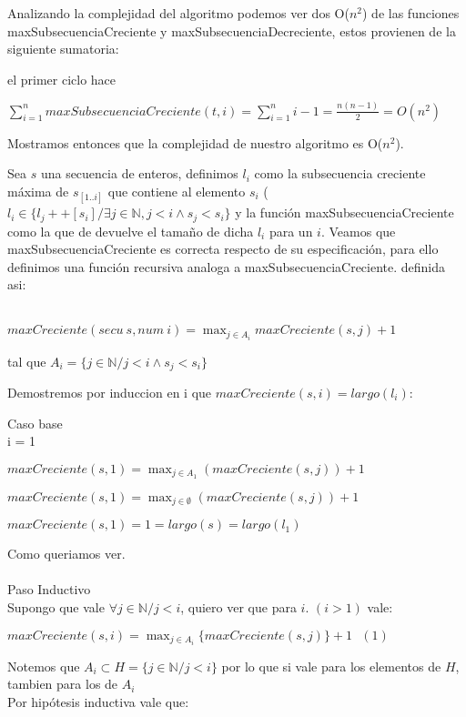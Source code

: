 Analizando la complejidad del algoritmo podemos ver dos O($n^{2}$) de las funciones maxSubsecuenciaCreciente y maxSubsecuenciaDecreciente, estos provienen de la siguiente sumatoria:

el primer ciclo hace

$\displaystyle\sum_{i=1}^n maxSubsecuenciaCreciente(t, i) = \sum_{i=1}^{n} i-1  = \frac{n(n-1)}{2} = O(n^{2})$

                       
Mostramos entonces que la complejidad de nuestro algoritmo es O($n^{2}$).




Sea $s$ una secuencia de enteros, definimos $l_i$ como la subsecuencia creciente máxima de $s_[1..i]$ que contiene al elemento $s_i$ ($l_i \in
  \{l_j ++ [s_i] / \exists j \in \mathbb{N}, j < i \land s_j < s_i\}$ y la función maxSubsecuenciaCreciente como la que de devuelve el tamaño de dicha $l_i$ para un $i$. Veamos que maxSubsecuenciaCreciente es correcta respecto de su especificación, para ello definimos una función recursiva analoga a maxSubsecuenciaCreciente. definida asi:\\
\\
    \centerline{$ \displaystyle maxCreciente(secu\ s, num\ i) = \max_{j \in A_i} maxCreciente(s, j) + 1$} 
    \centerline{tal que $A_i = \{ j \in \mathbb{N} / j < i \land s_j < s_i \}$}

Demostremos por induccion en i que $maxCreciente(s,i) = largo(l_i)$:

Caso base\\
i = 1 \\
\centerline{$\displaystyle maxCreciente(s, 1) = \max_{j \in A_1} (maxCreciente(s,j)) + 1$}
\centerline{$\displaystyle maxCreciente(s, 1) = \max_{j \in \emptyset} (maxCreciente(s,j)) + 1$}
\centerline{$\displaystyle maxCreciente(s, 1) = 1 = largo(s) = largo(l_1)$} 
Como queriamos ver.\\
\\
Paso Inductivo\\
Supongo que vale $\forall j \in \mathbb{N} / j < i$, quiero ver que para $i$. $(i > 1)$ vale:\\
\centerline{$\displaystyle maxCreciente(s, i) = \max_{j \in A_i} \{maxCreciente(s,j)\} + 1 \ \ \ (1)$}
Notemos que $ A_i \subset H = \{ j \in \mathbb{N} / j < i\} $ por lo que si vale para los elementos de $H$, tambien para los de $A_i$\\
Por hipótesis inductiva vale que:

